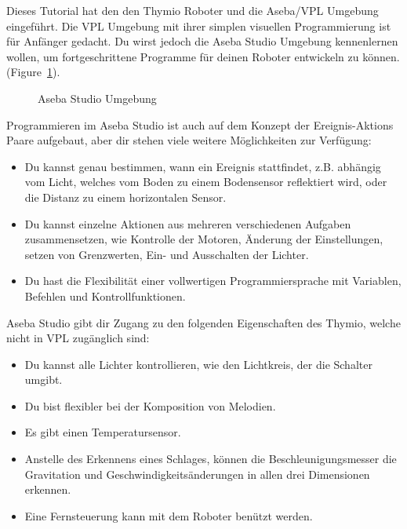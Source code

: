 

Dieses Tutorial hat den den Thymio Roboter und die Aseba/VPL Umgebung eingeführt. Die VPL Umgebung mit ihrer simplen visuellen Programmierung ist für Anfänger gedacht. Du wirst jedoch die Aseba Studio Umgebung kennenlernen wollen, um fortgeschrittene Programme für deinen Roboter entwickeln zu können. (Figure~\ref{fig.studio}).

\begin{figure}[hbt]
\begin{center}
\caption{Aseba Studio Umgebung}
\label{fig.studio}
\end{center}
\end{figure}

Programmieren im Aseba Studio ist auch auf dem Konzept der Ereignis-Aktions Paare aufgebaut, aber dir stehen viele weitere Möglichkeiten zur Verfügung:

\begin{itemize}
\item Du kannst genau bestimmen, wann ein Ereignis stattfindet, z.B. abhängig vom Licht, welches vom Boden zu einem Bodensensor reflektiert wird, oder die Distanz zu einem horizontalen Sensor.
\item  Du kannst einzelne Aktionen aus mehreren verschiedenen Aufgaben zusammensetzen, wie Kontrolle der Motoren, Änderung der Einstellungen, setzen von Grenzwerten, Ein- und Ausschalten der Lichter.
\item  Du hast die Flexibilität einer vollwertigen Programmiersprache mit Variablen, Befehlen und Kontrollfunktionen.

\end{itemize}

Aseba Studio gibt dir Zugang zu den folgenden Eigenschaften des Thymio, welche nicht in VPL zugänglich sind:

\begin{itemize}
\item Du kannst alle Lichter kontrollieren, wie den Lichtkreis, der die Schalter umgibt.
\item Du bist flexibler bei der Komposition von Melodien.
\item Es gibt einen Temperatursensor.
\item Anstelle des Erkennens eines Schlages, können die Beschleunigungsmesser die Gravitation und Geschwindigkeitsänderungen in allen drei Dimensionen erkennen. 
\item Eine Fernsteuerung kann mit dem Roboter benützt werden.
\end{itemize}

